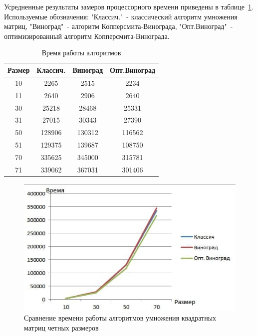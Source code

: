 \documentclass[12pt]{report}
\begin{document}
    Усредненные результаты замеров процессорного времени приведены в таблице~\ref{table:time}.
    Используемые обозначения: "Классич."\ - классический алгоритм умножения матриц,
    "Виноград"\ - алгоритм Копперсмита-Винограда,
    "Опт.Виноград"\ - оптимизированный алгоритм Копперсмита-Винограда.

    \begin{table}[h]
        \begin{center}
            \captionsetup{justification=raggedleft, singlelinecheck=false}
            \caption{\label{table:time} Время работы алгоритмов}
            \begin{tabular}{|c c c c|}
                \hline
                Размер & Классич. & Виноград & Опт.Виноград\\ [0.5ex]
                \hline
                10     & 2265     & 2515     & 2234         \\
                \hline
                11     & 2640     & 2906     & 2640         \\
                \hline
                30     & 25218    & 28468    & 25331        \\
                \hline
                31     & 27015    & 30343    & 27390        \\
                \hline
                50     & 128906   & 130312   & 116562       \\
                \hline
                51     & 129375   & 139687   & 108750       \\
                \hline
                70     & 335625   & 345000   & 315781       \\
                \hline
                71     & 339062   & 367031   & 301406       \\
                \hline
            \end{tabular}
        \end{center}
    \end{table}

    \begin{figure}[H]
        \centering
        \includegraphics[width=0.75\linewidth]{img/graph_even}
        \caption{Сравнение времени работы алгоритмов умножения квадратных матриц четных размеров}
        \label{fig:odd_graph}
    \end{figure}
\end{document}
